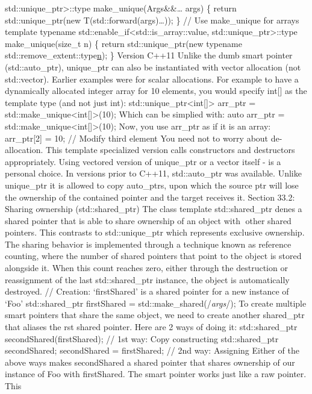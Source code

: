 std::unique\_ptr\textgreater::type make\_unique(Args\&\&\ldots{} args)
\{ return std::unique\_ptr(new T(std::forward(args)\ldots)); \} // Use
make\_unique for arrays template typename
std::enable\_if\textless std::is\_array::value,
std::unique\_ptr\textgreater::type make\_unique(size\_t n) \{ return
std::unique\_ptr(new typename std::remove\_extent::type\href{}{n}); \}
Version C++11 Unlike the dumb smart pointer (std::auto\_ptr),
unique\_ptr can also be instantiated with vector allocation (not
std::vector). Earlier examples were for scalar allocations. For example
to have a dynamically allocated integer array for 10 elements, you would
specify int{[}{]} as the template type (and not just int):
std::unique\_ptr\textless int{[}{]}\textgreater{} arr\_ptr =
std::make\_unique\textless int{[}{]}\textgreater(10); Which can be
simplied with: auto arr\_ptr =
std::make\_unique\textless int{[}{]}\textgreater(10); Now, you use
arr\_ptr as if it is an array: arr\_ptr{[}2{]} = 10; // Modify third
element You need not to worry about de-allocation. This template
specialized version calls constructors and destructors appropriately.
Using vectored version of unique\_ptr or a vector itself - is a personal
choice. In versions prior to C++11, std::auto\_ptr was available. Unlike
unique\_ptr it is allowed to copy auto\_ptrs, upon which the source ptr
will lose the ownership of the contained pointer and the target receives
it. Section 33.2: Sharing ownership (std::shared\_ptr) The class
template std::shared\_ptr denes a shared pointer that is able to share
ownership of an object with other shared pointers. This contrasts to
std::unique\_ptr which represents exclusive ownership. The sharing
behavior is implemented through a technique known as reference counting,
where the number of shared pointers that point to the object is stored
alongside it. When this count reaches zero, either through the
destruction or reassignment of the last std::shared\_ptr instance, the
object is automatically destroyed. // Creation: `firstShared' is a
shared pointer for a new instance of `Foo' std::shared\_ptr firstShared
= std::make\_shared(/\emph{args}/); To create multiple smart pointers
that share the same object, we need to create another shared\_ptr that
aliases the rst shared pointer. Here are 2 ways of doing it:
std::shared\_ptr secondShared(firstShared); // 1st way: Copy
constructing std::shared\_ptr secondShared; secondShared = firstShared;
// 2nd way: Assigning Either of the above ways makes secondShared a
shared pointer that shares ownership of our instance of Foo with
firstShared. The smart pointer works just like a raw pointer. This
